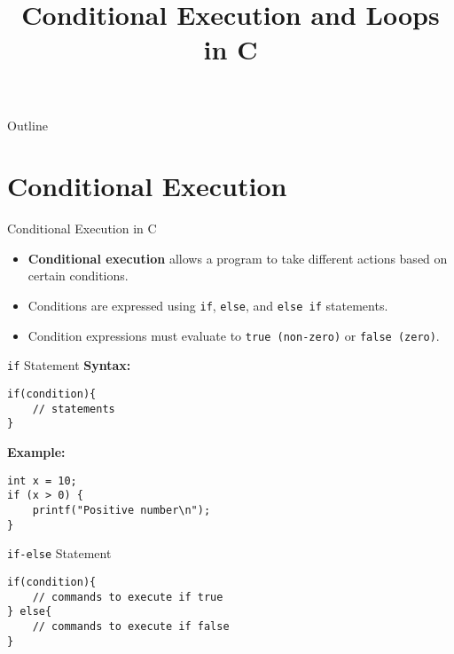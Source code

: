 \documentclass[12pt, aspectratio=169]{beamer}
\title{Conditional Execution and Loops in C}
\author{}
\date{}
\begin{document}
    {
		\addtocounter{framenumber}{-2}    %

		\begin{frame}
			\titlepage
		\end{frame}

		\begin{frame}{Outline}
            \vfill
			\tableofcontents[subsectionstyle=hide]
            \vfill
		\end{frame}
	}

    \section{Conditional Execution}

    \begin{frame}{Conditional Execution in C}
        \begin{itemize}
            \item \textbf{Conditional execution} allows a program to take different actions based on certain conditions.
            \item Conditions are expressed using \texttt{if}, \texttt{else}, and \texttt{else if} statements.
            \item Condition expressions must evaluate to \texttt{true (non-zero)} or \texttt{false (zero)}.
        \end{itemize}
    \end{frame}


    \begin{frame}[fragile]{\texttt{if} Statement}
        \textbf{Syntax:}
        \begin{verbatim}
if(condition){
    // statements
}
        \end{verbatim}

        \textbf{Example:}
        \begin{verbatim}
int x = 10;
if (x > 0) {
    printf("Positive number\n");
}
        \end{verbatim}

    \end{frame}


    \begin{frame}[fragile]{\texttt{if-else} Statement}
        \begin{verbatim}
if(condition){
    // commands to execute if true
} else{
    // commands to execute if false
}
        \end{verbatim}

    \end{frame}
\end{document}
